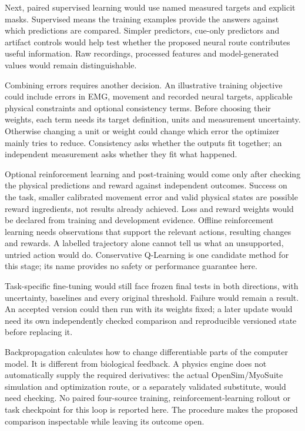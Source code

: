 Next, paired supervised learning would use named measured targets and
explicit masks. Supervised means the training examples provide the answers
against which predictions are compared. Simpler predictors, cue-only
predictors and artifact controls would help test whether the proposed neural
route contributes useful information. Raw recordings, processed features and
model-generated values would remain distinguishable.

Combining errors requires another decision. An illustrative training
objective could include errors in EMG, movement and recorded neural targets,
applicable physical constraints and optional consistency terms. Before
choosing their weights, each term needs its target definition, units and
measurement uncertainty. Otherwise changing a unit or weight could change
which error the optimizer mainly tries to reduce. Consistency asks whether
the outputs fit together; an independent measurement asks whether they fit
what happened.

Optional reinforcement learning and post-training would come only after
checking the physical predictions and reward against independent outcomes.
Success on the task, smaller calibrated movement error and valid physical
states are possible reward ingredients, not results already achieved.
Loss and reward weights would be declared from training and development
evidence. Offline reinforcement learning needs observations that support
the relevant actions, resulting changes and rewards. A labelled trajectory
alone cannot tell us what an unsupported, untried action would do.
Conservative Q-Learning is one candidate method for this stage; its name
provides no safety or performance guarantee here.

Task-specific fine-tuning would still face frozen final tests in both
directions, with uncertainty, baselines and every original threshold.
Failure would remain a result. An accepted version could then run with its
weights fixed; a later update would need its own independently checked comparison and reproducible versioned state before replacing it.

Backpropagation calculates how to change differentiable parts of the
computer model. It is different from biological feedback. A physics engine
does not automatically supply the required derivatives: the actual
OpenSim/MyoSuite simulation and optimization route, or a separately validated
substitute, would need checking. No paired four-source training, reinforcement-learning
rollout or task checkpoint for this loop is reported here. The procedure makes
the proposed comparison inspectable while leaving its outcome open.
